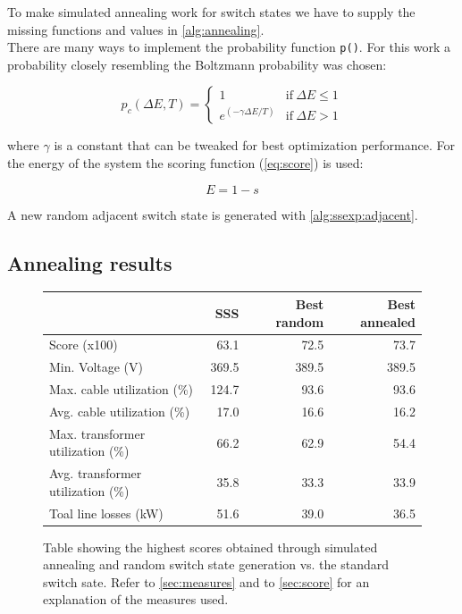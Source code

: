 To make simulated annealing work for switch states
we have to supply the missing functions and values
in \autoref{alg:annealing}.\\
There are many ways to implement the probability function \texttt{p()}. For this work
a probability closely resembling the Boltzmann probability was chosen:

\begin{equation}
    p_c(\Delta E, T) = \begin{cases}
        1 & \text{if} \ \Delta E \leq 1\\
        e^{(-\gamma \Delta E/ T)} & \text{if} \ \Delta E > 1
    \end{cases} 
\end{equation}

where $\gamma$ is a constant that can be tweaked for best optimization performance.
For the energy of the system the scoring function (\autoref{eq:score}) is used:

\begin{equation}
    E = 1 - s
\end{equation}

A new random adjacent switch state is generated with \autoref{alg:ssexp:adjacent}.

\subsection{Annealing results}

\begin{figure}[H]
    \centering
    \begin{tabular}{lrrr}
        \toprule
        & SSS & Best random & Best annealed\\
        \midrule
        Score (x100) & 63.1 & 72.5 & 73.7 \\
        Min. Voltage (V) & 369.5 & 389.5 & 389.5 \\
        Max. cable utilization (\%) & 124.7 & 93.6 & 93.6 \\
        Avg. cable utilization (\%) & 17.0 & 16.6 & 16.2 \\
        Max. transformer utilization (\%) & 66.2 & 62.9 & 54.4 \\
        Avg. transformer utilization (\%) & 35.8 & 33.3 & 33.9 \\
        Toal line losses (kW) & 51.6 & 39.0 & 36.5 \\
        \bottomrule
    \end{tabular}
    \caption{
        Table showing the highest scores obtained through simulated annealing
        and random switch state generation vs. the standard switch sate. Refer
        to \autoref{sec:measures} and to \autoref{sec:score} for an explanation
        of the measures used.
    }
    \label{table:annealing:compare}
\end{figure}

